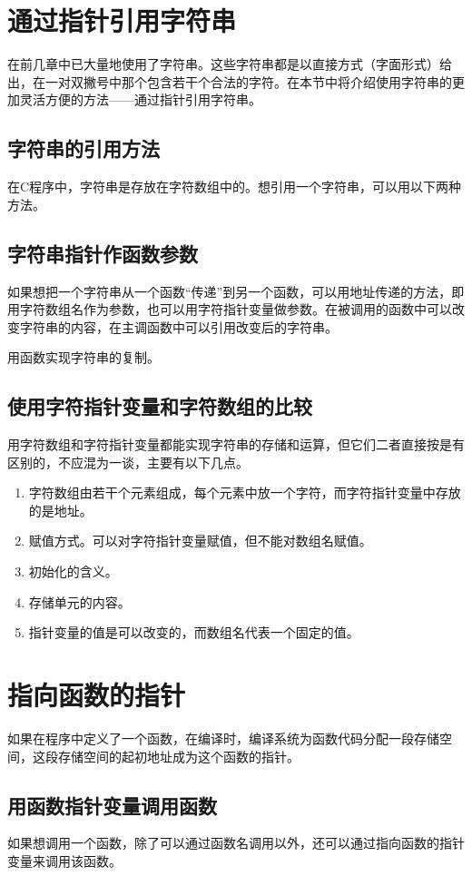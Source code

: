 \section{通过指针引用字符串}
在前几章中已大量地使用了字符串。这些字符串都是以直接方式（字面形式）给出，在一对双撇号中那个包含若干个合法的字符。在本节中将介绍使用字符串的更加灵活方便的方法——通过指针引用字符串。
\subsection{字符串的引用方法}
在C程序中，字符串是存放在字符数组中的。想引用一个字符串，可以用以下两种方法。
\subsection{字符串指针作函数参数}
如果想把一个字符串从一个函数“传递”到另一个函数，可以用地址传递的方法，即用字符数组名作为参数，也可以用字符指针变量做参数。在被调用的函数中可以改变字符串的内容，在主调函数中可以引用改变后的字符串。

用函数实现字符串的复制。
\subsection{使用字符指针变量和字符数组的比较}
用字符数组和字符指针变量都能实现字符串的存储和运算，但它们二者直接按是有区别的，不应混为一谈，主要有以下几点。
\begin{enumerate}
	\item 字符数组由若干个元素组成，每个元素中放一个字符，而字符指针变量中存放的是地址。
	\item 赋值方式。可以对字符指针变量赋值，但不能对数组名赋值。
	\item 初始化的含义。
	\item 存储单元的内容。
	\item 指针变量的值是可以改变的，而数组名代表一个固定的值。
\end{enumerate}
\section{指向函数的指针}
如果在程序中定义了一个函数，在编译时，编译系统为函数代码分配一段存储空间，这段存储空间的起初地址成为这个函数的指针。
\subsection{用函数指针变量调用函数}
如果想调用一个函数，除了可以通过函数名调用以外，还可以通过指向函数的指针变量来调用该函数。

